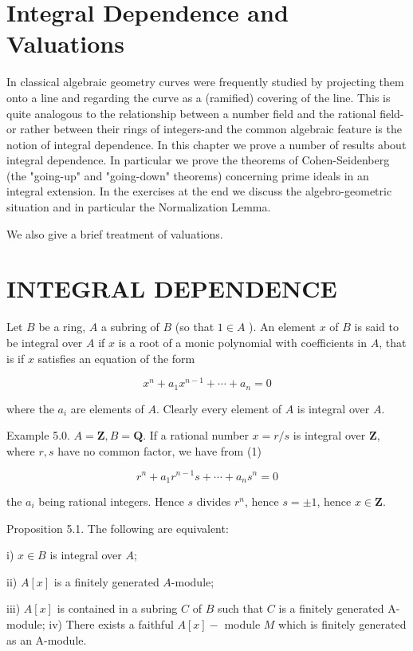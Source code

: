 \documentclass{standalone}
\theoremstyle{definition}
\theoremstyle{remark}
\begin{document}
\section{Integral Dependence and Valuations}
In classical algebraic geometry curves were frequently studied by projecting them onto a line and regarding the curve as a (ramified) covering of the line. This is quite analogous to the relationship between a number field and the rational field-or rather between their rings of integers-and the common algebraic feature is the notion of integral dependence. In this chapter we prove a number of results about integral dependence. In particular we prove the theorems of Cohen-Seidenberg (the "going-up" and "going-down" theorems) concerning prime ideals in an integral extension. In the exercises at the end we discuss the algebro-geometric situation and in particular the Normalization Lemma.

We also give a brief treatment of valuations.

\section{INTEGRAL DEPENDENCE}
Let $B$ be a ring, $A$ a subring of $B$ (so that $1 \in A$ ). An element $x$ of $B$ is said to be integral over $A$ if $x$ is a root of a monic polynomial with coefficients in $A$, that is if $x$ satisfies an equation of the form

\[
x^{n}+a_{1} x^{n-1}+\cdots+a_{n}=0
\]

where the $a_{i}$ are elements of $A$. Clearly every element of $A$ is integral over $A$.

Example 5.0. $A=\mathbf{Z}, B=\mathbf{Q}$. If a rational number $x=r / s$ is integral over $\mathbf{Z}$, where $r, s$ have no common factor, we have from (1)

\[
r^{n}+a_{1} r^{n-1} s+\cdots+a_{n} s^{n}=0
\]

the $a_{i}$ being rational integers. Hence $s$ divides $r^{n}$, hence $s= \pm 1$, hence $x \in \mathbf{Z}$.

Proposition 5.1. The following are equivalent:

i) $x \in B$ is integral over $A$;

ii) $A[x]$ is a finitely generated $A$-module;

iii) $A[x]$ is contained in a subring $C$ of $B$ such that $C$ is a finitely generated A-module; iv) There exists a faithful $A[x]-$ module $M$ which is finitely generated as an A-module.
\end{document}
